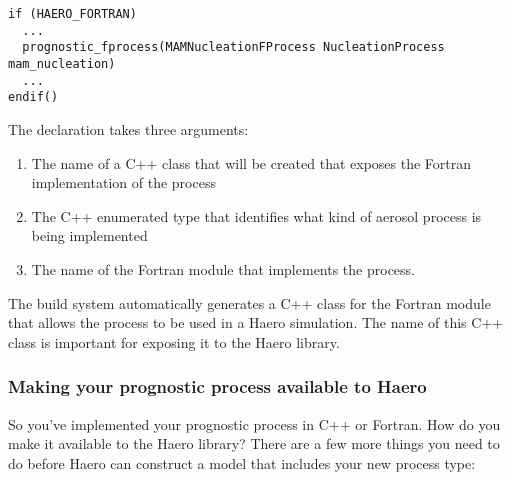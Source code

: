 \begin{lstlisting}
if (HAERO_FORTRAN)
  ...
  prognostic_fprocess(MAMNucleationFProcess NucleationProcess mam_nucleation)
  ...
endif()
\end{lstlisting}

The declaration takes three arguments:

\begin{enumerate}
  \item The name of a C++ class that will be created that exposes the Fortran
        implementation of the process
  \item The C++ enumerated type that identifies what kind of aerosol process
        is being implemented
  \item The name of the Fortran module that implements the process.
\end{enumerate}

The build system automatically generates a C++ class for the Fortran module that
allows the process to be used in a Haero simulation. The name of this C++ class
is important for exposing it to the Haero library.

\subsubsection{Making your prognostic process available to Haero}

So you've implemented your prognostic process in C++ or Fortran. How do you
make it available to the Haero library? There are a few more things you need to
do before Haero can construct a model that includes your new process type:


